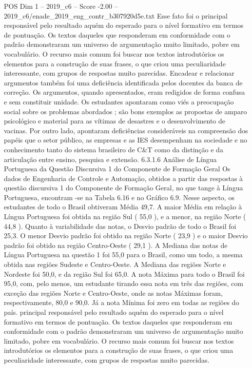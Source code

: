 \begin{textsample}{POS Dim 1 – 2019\_c6 – Score -2.00 – 2019\_c6/enade\_2019\_eng\_contr\_b307920d5e.txt}
Esse fato foi o principal responsável pelo resultado aquém do esperado para o nível formativo em termos de pontuação.
Os textos daqueles que responderam em conformidade com o padrão demonstraram um universo de argumentação muito limitado, pobre em vocabulário.
O recurso mais comum foi buscar nos textos introdutórios os elementos para a construção de suas frases, o que criou uma peculiaridade interessante, com grupos de respostas muito parecidas.
Encadear e relacionar argumentos também foi uma deficiência identificada pelos docentes da banca de correção.
Os argumentos, quando apresentados, eram redigidos de forma confusa e sem constituir unidade.
Os estudantes apontaram como viés a preocupação social sobre os problemas abordados ; são bons exemplos as propostas de amparo psicológico e material para as vítimas de desastres e o desenvolvimento de vacinas.
Por outro lado, apontaram deficiências consideráveis na compreensão dos papéis que o setor público, as empresas e as IES desempenham na sociedade e no conhecimento tanto do sistema brasileiro de C\&T como da distinção e da articulação entre ensino, pesquisa e extensão. 6.3.1.6 Análise de Língua Portuguesa da Questão Discursiva 1 do Componente de Formação Geral Os dados de Engenharia de Controle e Automação, obtidos a partir das respostas à questão discursiva 1 do Componente de Formação Geral, no que tange à Língua Portuguesa, encontram -se na Tabela 6.16 e no Gráfico 6.9.
Nesse aspecto, os estudantes de todo o Brasil obtiveram Média 49,7.
A maior Média em relação à Língua Portuguesa foi obtida na região Sul ( 55,0 ), e a menor, na região Norte ( 44,8 ).
Quanto à variabilidade das notas, o Desvio padrão de todo o Brasil foi 25,3.
O menor Desvio padrão foi obtido na região Norte ( 23,9 ) e o maior Desvio padrão foi obtido na região Centro-Oeste ( 29,1 ).
A Mediana das notas de Língua Portuguesa na questão 1 foi 55,0 para o Brasil, como um todo, a mesma obtida nas regiões Sudeste e Centro-Oeste.
A Mediana das regiões Norte e Nordeste foi 50,0, e da região Sul foi 65,0.
A nota Máxima para todo o Brasil foi 95,0, com, pelo menos, um estudante tirando essa nota em três das regiões, com exceção das regiões Norte e Centro-Oeste, onde as notas Máximas foram, respectivamente, 80,0 e 90,0.
Já a nota Mínima foi zero em todas as regiões do país. principal responsável pelo resultado aquém do esperado para o nível formativo em termos de pontuação.
Os textos daqueles que responderam em conformidade com o padrão demonstraram um universo de argumentação muito limitado, pobre em vocabulário.
O recurso mais comum foi buscar nos textos introdutórios os elementos para a construção de suas frases, o que criou uma peculiaridade interessante, com grupos de respostas muito parecidas.

\end{textsample}
